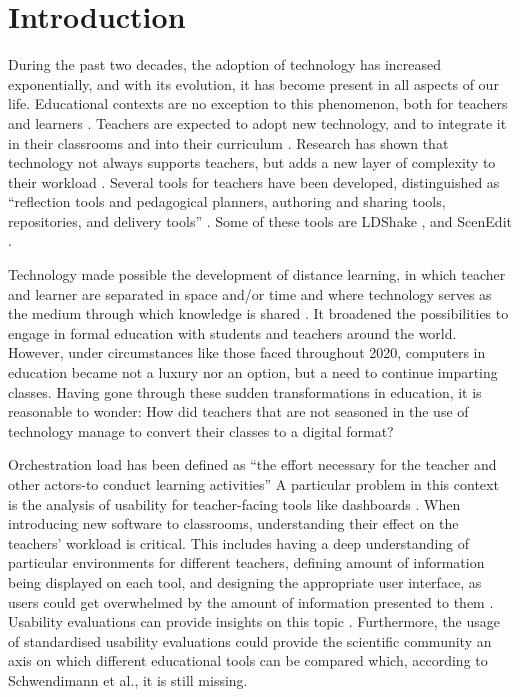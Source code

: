 \normallinespacing

\chapter{Introduction}
During the past two decades, the adoption of technology has increased exponentially, and with its evolution, it has become present in all aspects of our life. Educational contexts are no exception to this phenomenon, both for teachers and learners \cite{Raja2018-mr}. Teachers are expected to adopt new technology, and to integrate it in their classrooms and into their curriculum \cite{Wasson2020-lq}. Research has shown that technology not always supports teachers, but adds a new layer of complexity to their workload \cite{Prieto2015-gd}. Several tools for teachers have been developed, distinguished as “reflection tools and pedagogical planners, authoring and sharing tools, repositories, and delivery tools” \cite{Persico2015-hp}. Some of these tools are LDShake \cite{Hernandez-Leo2011-qa}, and ScenEdit \cite{Emin2010-dv}.

Technology made possible the development of distance learning, in which teacher and learner are separated in space and/or time \cite{perraton_1981} and where technology serves as the medium through which knowledge is shared \cite{keegan_1988}\cite{garrison_shale_1987}. It broadened the possibilities to engage in formal education with students and teachers around the world. However, under circumstances like those faced throughout 2020, computers in education became not a luxury nor an option, but a need to continue imparting classes. Having gone through these sudden transformations in education, it is reasonable to wonder: How did teachers that are not seasoned in the use of technology manage to convert their classes to a digital format?

Orchestration load has been defined as “the effort necessary for the teacher and other actors-to conduct learning activities” \cite{cuendet_2013} A particular problem in this context is the analysis of usability for teacher-facing tools like dashboards \cite{holden_rada_2011}. When introducing new software to classrooms, understanding their effect on the teachers' workload is critical. This includes having a deep understanding of particular environments for different teachers, defining amount of information being displayed on each tool, and designing the appropriate user interface, as users could get overwhelmed by the amount of information presented to them \cite{Schwendimann2017-ci}. Usability evaluations can provide insights on this topic \cite{Fernandez2011-ln}. Furthermore, the usage of standardised usability evaluations could provide the scientific community an axis on which different educational tools can be compared which, according to Schwendimann et al., \cite{Schwendimann2017-ci} it is still missing.


